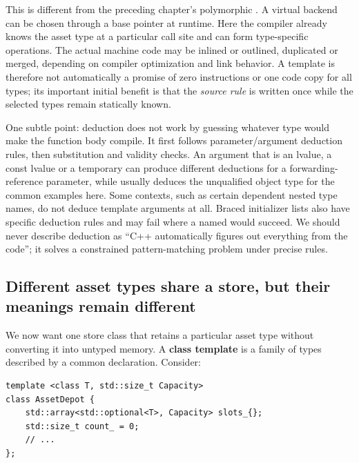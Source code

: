 This is different from the preceding chapter's polymorphic . A virtual backend can be chosen through a base pointer at runtime. Here the compiler already knows the asset type at a particular call site and can form type-specific operations. The actual machine code may be inlined or outlined, duplicated or merged, depending on compiler optimization and link behavior. A template is therefore not automatically a promise of zero instructions or one code copy for all types; its important initial benefit is that the \emph{source rule} is written once while the selected types remain statically known.

One subtle point: deduction does not work by guessing whatever type would make the function body compile. It first follows parameter/argument deduction rules, then substitution and validity checks. An argument that is an lvalue, a const lvalue or a temporary can produce different deductions for a forwarding-reference parameter, while  usually deduces the unqualified object type for the common examples here. Some contexts, such as certain dependent nested type names, do not deduce template arguments at all. Braced initializer lists also have specific deduction rules and may fail where a named  would succeed. We should never describe deduction as ``C++ automatically figures out everything from the code''; it solves a constrained pattern-matching problem under precise rules.

\subsection{Different asset types share a store, but their meanings remain different}\label{05-engine-i-ch005-different-asset-types-share-a-store-but-their-meanings-remain-different}

\hypertarget{05-engine-i-ch005-different-asset-types-share-a-store-but-their-meanings-remain-different}{}

We now want one store class that retains a particular asset type without converting it into untyped memory. A \textbf{class template} is a family of types described by a common declaration. Consider:

\begin{verbatim}
template <class T, std::size_t Capacity>
class AssetDepot {
    std::array<std::optional<T>, Capacity> slots_{};
    std::size_t count_ = 0;
    // ...
};
\end{verbatim}


